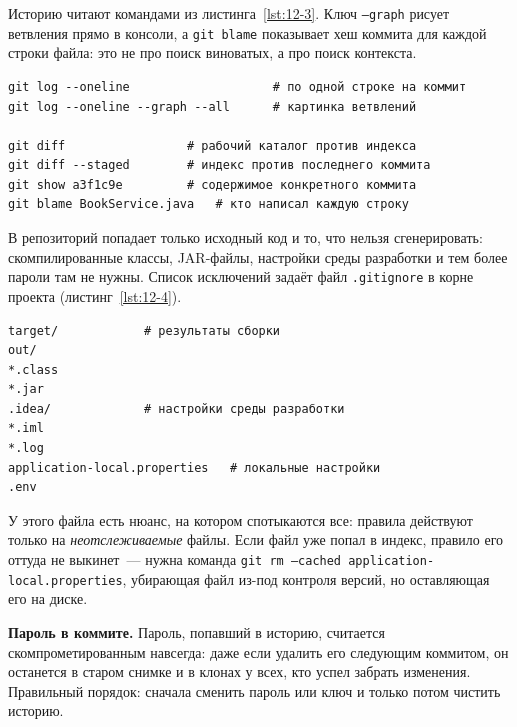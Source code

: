 Историю читают командами из листинга~\ref{lst:12-3}. Ключ \texttt{--graph} рисует ветвления прямо в консоли, а \texttt{git blame} показывает хеш коммита для каждой строки файла: это не про поиск виноватых, а про поиск контекста.

\begin{listing}[H]
\begin{verbatim}
git log --oneline                    # по одной строке на коммит
git log --oneline --graph --all      # картинка ветвлений

git diff                 # рабочий каталог против индекса
git diff --staged        # индекс против последнего коммита
git show a3f1c9e         # содержимое конкретного коммита
git blame BookService.java   # кто написал каждую строку
\end{verbatim}
\caption{Просмотр истории}
\label{lst:12-3}
\end{listing}

В репозиторий попадает только исходный код и то, что нельзя сгенерировать: скомпилированные классы, JAR-файлы, настройки среды разработки и тем более пароли там не нужны. Список исключений задаёт файл \texttt{.gitignore} в корне проекта (листинг~\ref{lst:12-4}).

\begin{listing}[H]
\begin{verbatim}
target/            # результаты сборки
out/
*.class
*.jar
.idea/             # настройки среды разработки
*.iml
*.log
application-local.properties   # локальные настройки
.env
\end{verbatim}
\caption{Типичный файл .gitignore для проекта на Java}
\label{lst:12-4}
\end{listing}

У этого файла есть нюанс, на котором спотыкаются все: правила действуют только на \emph{неотслеживаемые} файлы. Если файл уже попал в индекс, правило его оттуда не выкинет~--- нужна команда \texttt{git rm --cached application-local.properties}, убирающая файл из-под контроля версий, но оставляющая его на диске.

\begin{oshibka}
\textbf{Пароль в коммите.} Пароль, попавший в историю, считается скомпрометированным навсегда: даже если удалить его следующим коммитом, он останется в старом снимке и в клонах у всех, кто успел забрать изменения. Правильный порядок: сначала сменить пароль или ключ и только потом чистить историю.
\end{oshibka}

